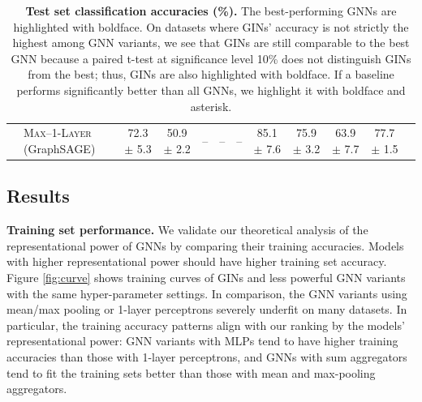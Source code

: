 \begin{table}[t]
{\begin{tabular}{@{}clcccccccccc@{}}
& \textsc{Max--1-Layer} (GraphSAGE)    &  72.3 $\pm$ 5.3           & 50.9 $\pm$ 2.2    &  --                         &  --                      &      --                    & 85.1 $\pm$ 7.6  & 75.9 $\pm$ 3.2 & 63.9 $\pm$ 7.7 & 77.7 $\pm$ 1.5 & \\         
\cmidrule[\heavyrulewidth]{2-12}
\end{tabular}}
 \caption{{\bf Test set classification accuracies (\%).} 
 The best-performing GNNs are highlighted with boldface. On datasets where GINs' accuracy is not strictly the highest among GNN variants, we see that GINs are still comparable to the best GNN because a paired t-test at significance level 10\% does not distinguish GINs from the best; thus, GINs are also highlighted with boldface. If a baseline performs significantly better than all GNNs, we highlight it with boldface and asterisk.
 }
  \label{tab:results}
  \vspace{-0.1in}
\end{table}


\subsection{Results}

{\bf Training set performance.}
We validate our theoretical analysis of the representational power of GNNs by comparing their training accuracies. Models with higher representational power should have higher training set accuracy.
Figure \ref{fig:curve} shows training curves of GINs and less powerful GNN variants with the same hyper-parameter settings. 
 In comparison, the GNN variants using mean/max pooling or 1-layer perceptrons severely underfit on many datasets. In particular, the training accuracy patterns align with our ranking by the models' representational power: GNN variants with MLPs tend to have higher training accuracies than those with 1-layer perceptrons, and GNNs with sum aggregators tend to fit the training sets better than those with mean and max-pooling aggregators. 

